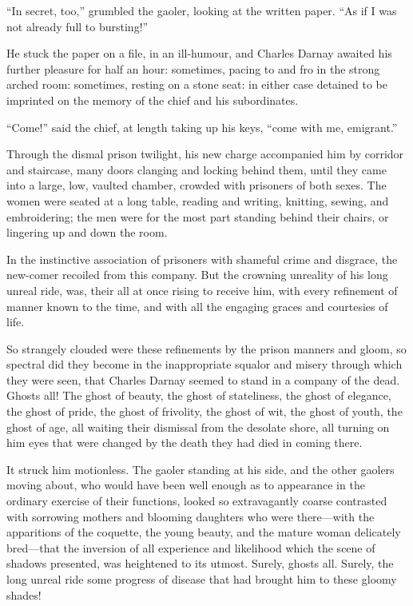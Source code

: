 ``In secret, too,'' grumbled the gaoler, looking at the written paper.
``As if I was not already full to bursting!''

He stuck the paper on a file, in an ill-humour, and Charles Darnay
awaited his further pleasure for half an hour:  sometimes, pacing to
and fro in the strong arched room:  sometimes, resting on a stone seat:
in either case detained to be imprinted on the memory of the chief
and his subordinates.

``Come!'' said the chief, at length taking up his keys, ``come with me, emigrant.''

Through the dismal prison twilight, his new charge accompanied him by
corridor and staircase, many doors clanging and locking behind them,
until they came into a large, low, vaulted chamber, crowded with
prisoners of both sexes.  The women were seated at a long table,
reading and writing, knitting, sewing, and embroidering; the men were
for the most part standing behind their chairs, or lingering up and
down the room.

In the instinctive association of prisoners with shameful crime and
disgrace, the new-comer recoiled from this company.  But the crowning
unreality of his long unreal ride, was, their all at once rising to
receive him, with every refinement of manner known to the time, and
with all the engaging graces and courtesies of life.

So strangely clouded were these refinements by the prison manners and
gloom, so spectral did they become in the inappropriate squalor and
misery through which they were seen, that Charles Darnay seemed to
stand in a company of the dead.  Ghosts all!  The ghost of beauty,
the ghost of stateliness, the ghost of elegance, the ghost of pride,
the ghost of frivolity, the ghost of wit, the ghost of youth, the
ghost of age, all waiting their dismissal from the desolate shore,
all turning on him eyes that were changed by the death they had died
in coming there.

It struck him motionless.  The gaoler standing at his side, and the
other gaolers moving about, who would have been well enough as to
appearance in the ordinary exercise of their functions, looked so
extravagantly coarse contrasted with sorrowing mothers and blooming
daughters who were there---with the apparitions of the coquette,
the young beauty, and the mature woman delicately bred---that the
inversion of all experience and likelihood which the scene of shadows
presented, was heightened to its utmost.  Surely, ghosts all.
Surely, the long unreal ride some progress of disease that had
brought him to these gloomy shades!

